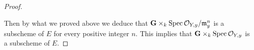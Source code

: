 \begin{proof}
\begin{center}
\end{center}
Then by what we proved above we deduce that $\mathbf{G}\times_k\mathrm{Spec}\, {\mathcal O}_{Y,y}/\mathfrak{m}^n_y$ is a subscheme of $E$ for every positive integer $n$. This implies that $\mathbf{G}\times_k\mathrm{Spec}\, {\mathcal O}_{Y,y}$ is a subscheme of $E$.

\end{proof}

\small




